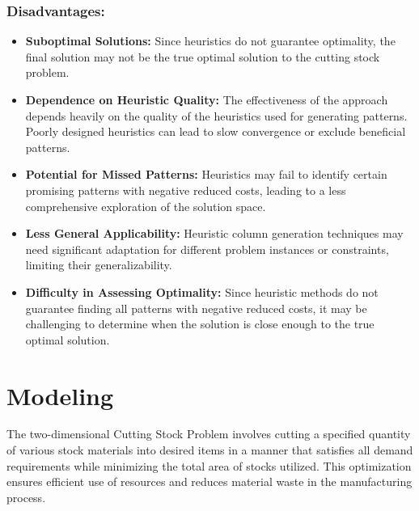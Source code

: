 \documentclass[a4paper]{article}
\begin{document}
\subsubsection*{Disadvantages:}
\begin{itemize}
    \item \textbf{Suboptimal Solutions:} Since heuristics do not guarantee optimality, the final solution may not be the true optimal solution to the cutting stock problem.
    \item \textbf{Dependence on Heuristic Quality:} The effectiveness of the approach depends heavily on the quality of the heuristics used for generating patterns. Poorly designed heuristics can lead to slow convergence or exclude beneficial patterns.
    \item \textbf{Potential for Missed Patterns:} Heuristics may fail to identify certain promising patterns with negative reduced costs, leading to a less comprehensive exploration of the solution space.
    \item \textbf{Less General Applicability:} Heuristic column generation techniques may need significant adaptation for different problem instances or constraints, limiting their generalizability.
    \item \textbf{Difficulty in Assessing Optimality:} Since heuristic methods do not guarantee finding all patterns with negative reduced costs, it may be challenging to determine when the solution is close enough to the true optimal solution.
\end{itemize}

\section{Modeling}
The two-dimensional Cutting Stock Problem involves cutting a specified quantity of various stock materials into desired items in a manner that satisfies all demand requirements while minimizing the total area of stocks utilized. This optimization ensures efficient use of resources and reduces material waste in the manufacturing process.

\vspace{0.4cm}
\end{document}
